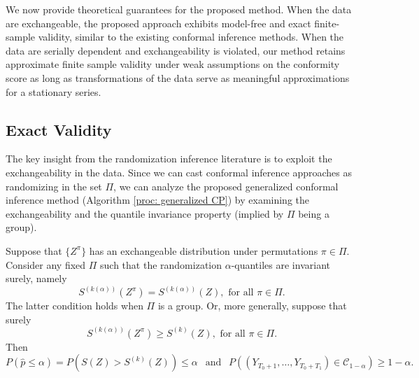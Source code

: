 \documentclass[final,12pt]{colt2018} %
\begin{document}
We now provide theoretical guarantees for the proposed method. When the data are exchangeable, the proposed approach exhibits model-free and exact finite-sample validity, similar to the existing conformal inference methods. When the data are serially dependent and exchangeability is violated, our method retains approximate finite sample validity under weak assumptions on the conformity score as long as transformations of the data serve as meaningful approximations for a stationary series.





\subsection{Exact Validity}

The key insight from the randomization inference literature is to exploit the exchangeability in the data. Since we can cast conformal inference approaches as randomizing in the set $\Pi$, we can analyze the proposed generalized conformal inference method (Algorithm \ref{proc: generalized CP}) by examining the exchangeability
and the quantile invariance property (implied by $\Pi$ being a group). 

\begin{theorem} \label{prop: general exact validity}
Suppose that $\{ Z^\pi\}$ has an exchangeable distribution under permutations $\pi \in \Pi$. Consider any fixed  $\Pi$  such that  the randomization $\alpha$-quantiles are invariant surely, namely
$$ S^{(k(\alpha))}(Z^\pi) = S^{(k(\alpha))}(Z), \text{ for all } \pi \in \Pi.$$
The latter condition holds when $\Pi$ is a group. Or, more generally, suppose that  surely \begin{equation}\label{quant bound}
 S^{(k(\alpha))}(Z^\pi)  \geq S^{(k)}(Z),  \text{ for all } \pi \in \Pi.
 \end{equation}
Then
$$
P(\hat p  \leq \alpha) =  P(  S(Z) > S^{(k)}(Z) ) \leq \alpha \ \ \text{ 
and } \ \ P((Y_{T_0+1},\dots,Y_{T_0+T_1}) \in \mathcal{C}_{1-\alpha})\geq 1-\alpha.$$
\end{theorem}
\end{document}
